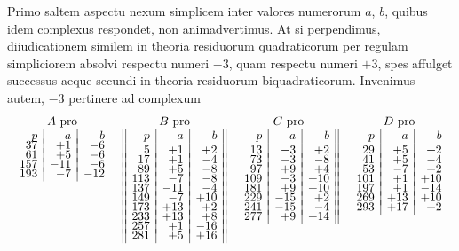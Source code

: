 \documentclass[twoside,12pt, showframe]{memoir}
\begin{document}
Primo saltem aspectu nexum simplicem inter valores numerorum \(a\), \(b\), quibus idem complexus respondet, non animadvertimus. At si perpendimus, diiudicationem similem in theoria residuorum quadraticorum per regulam simpliciorem absolvi respectu numeri \(-3\), quam respectu numeri \(+3\), spes affulget successus aeque secundi in theoria residuorum biquadraticorum. Invenimus autem, \(-3\) pertinere ad complexum
\[\begin{array}{cccc}
\begin{array}[t]{r|r|r} 
\multicolumn{3}{c}{ A \text{ pro} }\\
p & a & b \\[-4pt]
37&+1&-6\\[-4pt]
61&+5&-6\\[-4pt]
157&-11&-6\\[-4pt]
193 & -7 & -12 
\end{array} & 
\begin{array}[t]{||r|r|r||} 
\multicolumn{3}{c}{ B \text{ pro} }\\
p & a & b \\
5&+1&+2\\[-4pt]
17&+1&-4\\[-4pt]
89&+5&-8\\[-4pt]
113&-7&-8\\[-4pt]
137&-11&-4\\[-4pt]
149&-7&+10\\[-4pt]
173&+13&+2\\[-4pt]
233&+13&+8\\[-4pt]
257&+1&-16\\[-4pt]
281&+5&+16
\end{array}&
\begin{array}[t]{r|r|r||} 
\multicolumn{3}{c}{ C \text{ pro} }\\
p & a & b \\
13 & -3 & +2 \\[-4pt]
73&-3&-8\\[-4pt]
97&+9&+4\\[-4pt]
109 & -3 & +10 \\[-4pt]
181 & +9 & +10 \\[-4pt]
229 & -15 & +2 \\[-4pt]
241&-15&-4 \\[-4pt]
 277 & +9 & +14 
\end{array}
&
 \begin{array}[t]{r|r|r} 
  \multicolumn{3}{c}{ D \text{ pro} }\\
 p & a & b \\
29&+5&+2\\[-4pt]
41&+5&-4\\[-4pt]
53&-7&+2\\[-4pt]
101&+1&+10\\[-4pt]
197&+1&-14\\[-4pt]
269&+13&+10\\[-4pt]
293&+17&+2 
\end{array}
\end{array}\]
\end{document}
